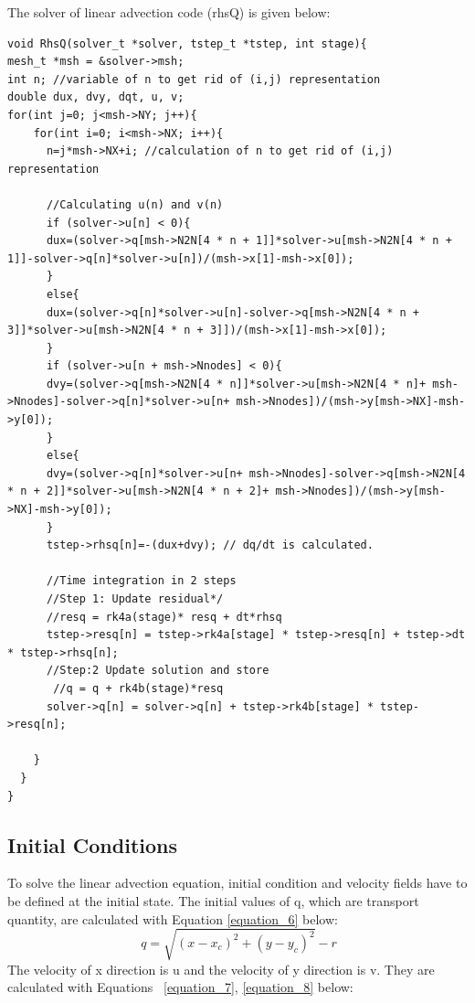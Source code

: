 \documentclass{article}
\begin{document}
\clearpage
The solver of linear advection code (rhsQ) is given below: 
\begin{verbatim}
void RhsQ(solver_t *solver, tstep_t *tstep, int stage){
mesh_t *msh = &solver->msh;
int n; //variable of n to get rid of (i,j) representation
double dux, dvy, dqt, u, v;
for(int j=0; j<msh->NY; j++){
    for(int i=0; i<msh->NX; i++){
      n=j*msh->NX+i; //calculation of n to get rid of (i,j) representation

      //Calculating u(n) and v(n)
      if (solver->u[n] < 0){
      dux=(solver->q[msh->N2N[4 * n + 1]]*solver->u[msh->N2N[4 * n + 1]]-solver->q[n]*solver->u[n])/(msh->x[1]-msh->x[0]);
      }
      else{
      dux=(solver->q[n]*solver->u[n]-solver->q[msh->N2N[4 * n + 3]]*solver->u[msh->N2N[4 * n + 3]])/(msh->x[1]-msh->x[0]);      
      }
      if (solver->u[n + msh->Nnodes] < 0){
      dvy=(solver->q[msh->N2N[4 * n]]*solver->u[msh->N2N[4 * n]+ msh->Nnodes]-solver->q[n]*solver->u[n+ msh->Nnodes])/(msh->y[msh->NX]-msh->y[0]);
      }
      else{
      dvy=(solver->q[n]*solver->u[n+ msh->Nnodes]-solver->q[msh->N2N[4 * n + 2]]*solver->u[msh->N2N[4 * n + 2]+ msh->Nnodes])/(msh->y[msh->NX]-msh->y[0]);      
      }
      tstep->rhsq[n]=-(dux+dvy); // dq/dt is calculated.

      //Time integration in 2 steps 
      //Step 1: Update residual*/
      //resq = rk4a(stage)* resq + dt*rhsq
      tstep->resq[n] = tstep->rk4a[stage] * tstep->resq[n] + tstep->dt * tstep->rhsq[n];
      //Step:2 Update solution and store
       //q = q + rk4b(stage)*resq
      solver->q[n] = solver->q[n] + tstep->rk4b[stage] * tstep->resq[n];

    }
  }
}
\end{verbatim}


\clearpage
\subsection{Initial Conditions}
To solve the linear advection equation, initial condition and velocity fields have to be defined at the initial state. The initial values of q, which are transport quantity, are calculated with Equation \ref{equation_6} below:\\
\begin{equation} %
    \ q = \sqrt{(x - x_{c})^2+(y - y_{c})^2} - r 
    \label{equation_6}
\end{equation}
The velocity of x direction is u and the velocity of y direction is v. They are calculated with Equations~ \ref{equation_7}, \ref{equation_8} below: 
\end{document}
